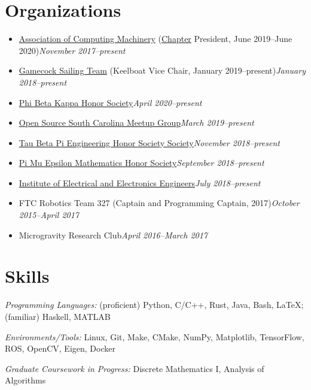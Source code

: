 \documentclass[\ifdefined\cv11pt\else10pt\fi,letterpaper]{moderncv}
\newcommand{\cvonly}[1]{\ifdefined\cv#1\fi\ignorespaces}
\newcommand{\resumeonly}[1]{\ifdefined\cv\else#1\fi\ignorespaces}
\renewcommand{\cvitem}[2]{\item {#1}\hfill\textit{#2}}
\let\oldsection\section
\renewcommand{\section}[1]{\vspace*{-1.3ex}\oldsection{#1}\vspace*{-0.5ex}}
\begin{document}
\section{\textbf{Organizations}}
\begin{itemize}
	\cvitem{\href{https://www.acm.org/}{Association of Computing Machinery} (\href{https://acm.cse.sc.edu/}{Chapter} President, June 2019--June 2020)}{November 2017--present}
	\cvitem{\href{https://www.gamecocksailing.com/}{Gamecock Sailing Team} (Keelboat Vice Chair, January 2019--present)}{January 2018--present}
	\cvitem{\href{https://www.pbk.org/}{Phi Beta Kappa Honor Society}}{April 2020--present}
	\cvitem{\href{https://www.meetup.com/Open-Source-South-Carolina/}{Open Source South Carolina Meetup Group}}{March 2019--present}
	\cvitem{\href{https://tbp.org/}{Tau Beta Pi Engineering Honor Society Society}}{November 2018--present}
	\cvitem{\href{https://pme-math.org/}{Pi Mu Epsilon Mathematics Honor Society}}{September 2018--present}
	\cvitem{\href{https://www.ieee.org/}{Institute of Electrical and Electronics Engineers}}{July 2018--present}
	\cvonly{
		\cvitem{FTC Robotics Team 327 (Captain and Programming Captain, 2017)}{October 2015--April 2017}
		\cvitem{Microgravity Research Club}{April 2016--March 2017}
	}
\end{itemize}

\resumeonly{\enlargethispage{2\baselineskip}}
\section{Skills}
\textit{Programming Languages:} (proficient) Python, C/C++, Rust, Java, Bash, \LaTeX; (familiar) Haskell, MATLAB \par
\textit{Environments/Tools:} Linux, Git, Make, CMake, NumPy, Matplotlib, TensorFlow, ROS, OpenCV, Eigen, Docker \par
\textit{Graduate Coursework in Progress:} Discrete Mathematics I, Analysis of Algorithms
\end{document}
